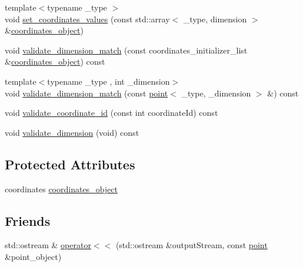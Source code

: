 \begin{DoxyCompactItemize}
\item 
{\footnotesize template$<$typename \-\_\-type $>$ }\\void \hyperlink{classxstd_1_1point_a16ea81630c6918bca7393e7ce46e1691}{set\-\_\-coordinates\-\_\-values} (const std\-::array$<$ \-\_\-type, dimension $>$ \&\hyperlink{classxstd_1_1point_a6ee0acdc7f3fdd004426279d0d7963e6}{coordinates\-\_\-object})
\item 
void \hyperlink{classxstd_1_1point_a5e32aa4388cfc0d9b9b3df56c5d8bd91}{validate\-\_\-dimension\-\_\-match} (const coordinates\-\_\-initializer\-\_\-list \&\hyperlink{classxstd_1_1point_a6ee0acdc7f3fdd004426279d0d7963e6}{coordinates\-\_\-object}) const 
\item 
{\footnotesize template$<$typename \-\_\-type , int \-\_\-dimension$>$ }\\void \hyperlink{classxstd_1_1point_a15edf9d511dcd8d27c98e77b18033573}{validate\-\_\-dimension\-\_\-match} (const \hyperlink{classxstd_1_1point}{point}$<$ \-\_\-type, \-\_\-dimension $>$ \&) const 
\item 
void \hyperlink{classxstd_1_1point_a9c83662efe0927f03cb9cb1cfab796cd}{validate\-\_\-coordinate\-\_\-id} (const int coordinate\-Id) const 
\item 
void \hyperlink{classxstd_1_1point_a1d9e30c142c79d1c21bdb271c81dabb5}{validate\-\_\-dimension} (void) const 
\end{DoxyCompactItemize}
\subsection*{Protected Attributes}
\begin{DoxyCompactItemize}
\item 
coordinates \hyperlink{classxstd_1_1point_a6ee0acdc7f3fdd004426279d0d7963e6}{coordinates\-\_\-object}
\end{DoxyCompactItemize}
\subsection*{Friends}
\begin{DoxyCompactItemize}
\item 
std\-::ostream \& \hyperlink{classxstd_1_1point_a26f9c85c349535d8d87c0b2b4dda134e}{operator$<$$<$} (std\-::ostream \&output\-Stream, const \hyperlink{classxstd_1_1point}{point} \&point\-\_\-object)
\end{DoxyCompactItemize}


